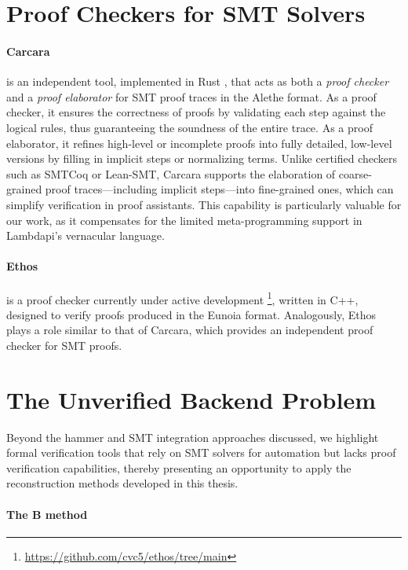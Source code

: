 \section{Proof Checkers for SMT Solvers}

\paragraph{Carcara} \cite{carcara} is an independent tool, implemented in Rust \cite{rust}, that acts as both a \emph{proof checker} and a \emph{proof elaborator} for SMT proof traces in the Alethe format.
As a proof checker, it ensures the correctness of proofs by validating each step against the logical rules, thus guaranteeing the soundness of the entire trace.
As a proof elaborator, it refines high-level or incomplete proofs into fully detailed, low-level versions by filling in implicit steps or normalizing terms.
Unlike certified checkers such as SMTCoq or Lean-SMT, Carcara supports the elaboration of coarse-grained proof traces—including implicit steps—into fine-grained ones, which can simplify verification in proof assistants.
This capability is particularly valuable for our work, as it compensates for the limited meta-programming support in Lambdapi’s vernacular language.

\paragraph{Ethos} is a proof checker currently under active development \footnote{\url{https://github.com/cvc5/ethos/tree/main}}, written in C++, designed to verify proofs produced in the Eunoia format.
Analogously, Ethos plays a role similar to that of Carcara, which provides an independent proof checker for SMT proofs.


\section{The Unverified Backend Problem}
\label{sec:problem-tlaps-proof}

Beyond the hammer and SMT integration approaches discussed,
we highlight formal verification tools that rely on SMT solvers for automation but lacks proof verification capabilities,
thereby presenting an opportunity to apply the reconstruction methods developed in this thesis.

\paragraph{The B method}

